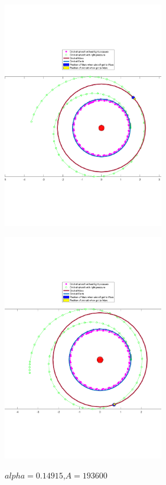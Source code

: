 \documentclass[../Paper.tex]{subfiles}
\begin{document}
\begin{figure}[H]
 \begin{minipage}[t]{0.5\linewidth}
 \centering{}
 \includegraphics[width=7cm]{../Figures/orbit2.pdf}
 \label{fig:orbit2}
\caption{$alpha=0.2198$,$A=176400$}
 \end{minipage}
 \begin{minipage}[t]{0.5\linewidth}
 \centering{}
 \includegraphics[width=7cm]{../Figures/orbit3.pdf}
 \label{fig:orbit3}
\caption{$alpha=0.14915$,$A=193600$}
 \end{minipage}
\end{figure}
\end{document}
